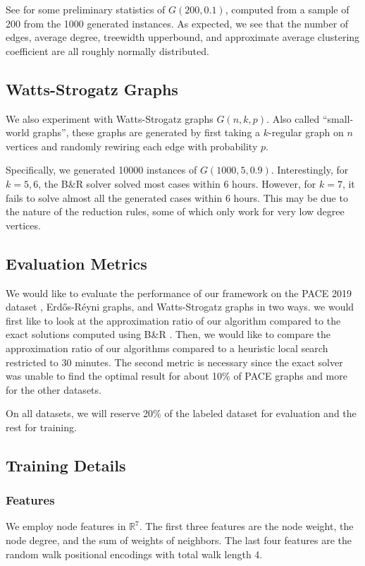 \documentclass{article}
\newcommand{\R}{\mathbb{R}}
\begin{document}
See  for some preliminary statistics of $G(200, 0.1)$,
computed from a sample of 200 from the 1000 generated instances.
As expected,
we see that the number of edges,
average degree,
treewidth upperbound,
and approximate average clustering coefficient
are all roughly normally distributed.

\subsection{Watts-Strogatz Graphs}
We also experiment with Watts-Strogatz graphs $G(n, k, p)$.
Also called ``small-world graphs'',
these graphs are generated by first taking a $k$-regular graph on $n$ vertices
and randomly rewiring each edge with probability $p$.

Specifically,
we generated 10000 instances of $G(1000, 5, 0.9)$.
Interestingly, for $k=5,6$,
the B\&R solver solved most cases within 6 hours.
However, for $k=7$, it fails to solve almost all the generated cases within 6 hours.
This may be due to the nature of the reduction rules,
some of which only work for very low degree vertices.

\subsection{Evaluation Metrics}
We would like to evaluate the performance of our framework on the PACE 2019 dataset \citet{pace2019},
Erd\H os-R\'eyni graphs,
and Watts-Strogatz graphs in two ways.
we would first like to look at the approximation ratio of our algorithm compared to the exact solutions
computed using B\&R \citet{kamis}.
Then, we would like to compare the approximation ratio of our algorithms compared to a heuristic local search
restricted to 30 minutes.
The second metric is necessary since the exact solver was unable to find the optimal result for about 10\% of PACE graphs
and more for the other datasets.

On all datasets,
we will reserve 20\% of the labeled dataset for evaluation
and the rest for training.

\subsection{Training Details}
\subsubsection{Features}
We employ node features in $\R^7$.
The first three features are the node weight,
the node degree,
and the sum of weights of neighbors.
The last four features are the random walk positional encodings
with total walk length 4.
\end{document}
